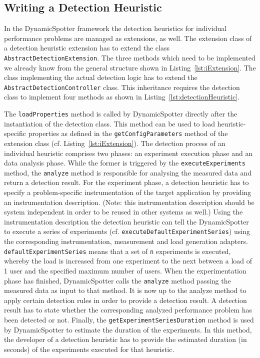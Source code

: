 \documentclass{report}
\newcommand{\DS}{DynamicSpotter }
\begin{document}
\subsection{Writing a Detection Heuristic}
In the \DS framework the detection heuristics for individual performance problems are managed as extensions, as well.
The extension class of a detection heuristic extension has to extend the class \texttt{AbstractDetectionExtension}. 
The three methods which need to be implemented we already know from the general structure shown in
Listing~\ref{lst:iExtension}. The class implementing the actual detection logic has to extend the
\texttt{AbstractDetectionController} class. This inheritance requires the detection class to implement four methods as
shown in Listing~\ref{lst:detectionHeuristic}.

The \texttt{loadProperties} method is called by \DS directly after the instantiation of the detection class. This method
can be used to load heuristic-specific properties as defined in the \texttt{getConfigParameters} method of the extension
class (cf. Listing~\ref{lst:iExtension}). The detection process of an individual heuristic comprises two phases: an
experiment execution phase and an data analysis phase. While the former is triggered by the \texttt{executeExperiments}
method, the \texttt{analyze} method is responsible for analysing the measured data and return a detection result.
For the experiment phase, a detection heuristic has to specify a problem-specific instrumentation of the target
application by providing an instrumentation description. (Note: this instrumentation description should be system
independent in order to be reused in other systems as well.) Using the instrumentation description the detection
heuristic can tell the \DS to execute a series of experiments (cf. \texttt{executeDefaultExperimentSeries}) using the
corresponding instrumentation, measurement and load generation adapters. \texttt{defaultExperimentSeries} means that a
set of \texttt{n} experiments is executed, whereby the load is increased from one experiment to the next between a load
of 1 user and the specified maximum number of users. When the experimentation phase has finished, \DS calls the
\texttt{analyze} method passing the measured data as input to that method. It is now up to the analyze method to apply
certain detection rules in order to provide a detection result. A detection result has to state whether the
corresponding analyzed performance problem has been detected or not.
Finally, the \texttt{getExperimentSeriesDuration} method is used by \DS to estimate the duration of the experiments. In this
method, the developer of a detection heuristic has to provide the estimated duration (in seconds) of the experiments
executed for that heuristic.
\end{document}
